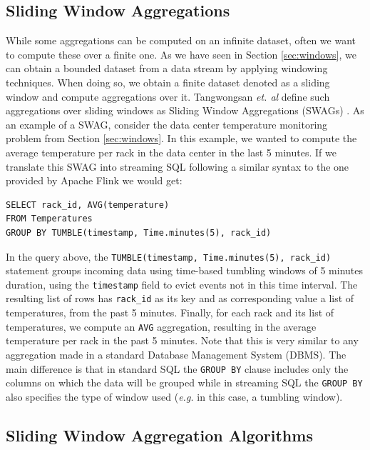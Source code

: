 \subsection{Sliding Window Aggregations}

While some aggregations can be computed on an infinite dataset, often we want to compute these over a finite one. As we have seen in Section \ref{sec:windows}, we can obtain a bounded dataset from a data stream by applying windowing techniques. When doing so, we obtain a finite dataset denoted as a sliding window and compute aggregations over it. Tangwongsan \emph{et. al} define such aggregations over sliding windows as Sliding Window Aggregations (SWAGs) \cite{Tangwongsan-Sliding-Window-Aggregation-Algorithms}. As an example of a SWAG, consider the data center temperature monitoring problem from Section \ref{sec:windows}. In this example, we wanted to compute the average temperature per rack in the data center in the last 5 minutes. If we translate this SWAG into streaming SQL following a similar syntax to the one provided by Apache Flink \cite{ApacheFlink} we would get:

\begin{verbatim}
SELECT rack_id, AVG(temperature)
FROM Temperatures
GROUP BY TUMBLE(timestamp, Time.minutes(5), rack_id)
\end{verbatim}

In the query above, the
\texttt{TUMBLE(timestamp, Time.minutes(5), rack\_id)} statement groups incoming data using time-based tumbling windows of 5 minutes duration, using the \texttt{timestamp} field to evict events not in this time interval. The resulting list of rows has \texttt{rack\_id} as its key and as corresponding value a list of temperatures, from the past 5 minutes. Finally, for each rack and its list of temperatures, we compute an \texttt{AVG} aggregation, resulting in the average temperature per rack in the past 5 minutes. Note that this is very similar to any aggregation made in a standard Database Management System (DBMS). The main difference is that in standard SQL the \texttt{GROUP BY} clause includes only the columns on which the data will be grouped while in streaming SQL the \texttt{GROUP BY} also specifies the type of window used (\textit{e.g.} in this case, a tumbling window).


\subsection{Sliding Window Aggregation Algorithms} \label{sec:back-swag-algs}

